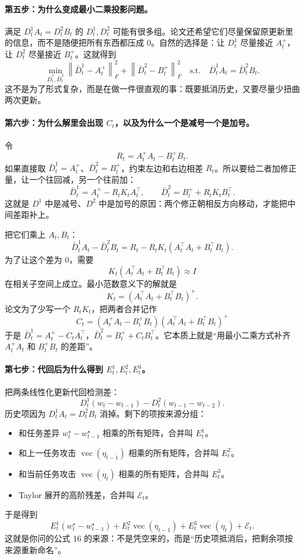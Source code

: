\documentclass[UTF8,fontset=none,11pt]{ctexart}
\theoremstyle{cnstyle}
\newcommand{\vect}{\operatorname{vec}}
\newcommand{\norm}[1]{\left\lVert #1\right\rVert}
\begin{document}
\paragraph{第五步：为什么变成最小二乘投影问题。}
满足 \(D_t^1A_t=D_t^2B_t\) 的 \(D_t^1,D_t^2\) 可能有很多组。论文还希望它们尽量保留原更新里的信息，而不是随便把所有东西都压成 0。自然的选择是：让 \(D_t^1\) 尽量接近 \(A_t^+\)，让 \(D_t^2\) 尽量接近 \(B_t^+\)。这就得到
\[
  \min_{\bar D_t^1,\bar D_t^2}
  \norm{\bar D_t^1-A_t^+}_F^2
  +\norm{\bar D_t^2-B_t^+}_F^2
  \quad
  \text{s.t.}\quad
  \bar D_t^1A_t=\bar D_t^2B_t.
\]
这不是为了形式复杂，而是在做一件很直观的事：既要抵消历史，又要尽量少扭曲两次更新。

\paragraph{第六步：为什么解里会出现 \(C_t\)，以及为什么一个是减号一个是加号。}
令
\[
  R_t=A_t^+A_t-B_t^+B_t.
\]
如果直接取 \(\bar D_t^1=A_t^+\)、\(\bar D_t^2=B_t^+\)，约束左边和右边相差 \(R_t\)。所以要给二者加修正量，让一个往回减，另一个往前加：
\[
  \bar D_t^1=A_t^+-R_tK_tA_t^\top,
  \qquad
  \bar D_t^2=B_t^+ +R_tK_tB_t^\top.
\]
这就是 \(D^1\) 中是减号、\(D^2\) 中是加号的原因：两个修正朝相反方向移动，才能把中间差距补上。

把它们乘上 \(A_t,B_t\)：
\[
  \bar D_t^1A_t-\bar D_t^2B_t
  =
  R_t-R_tK_t(A_t^\top A_t+B_t^\top B_t).
\]
为了让这个差为 0，需要
\[
  K_t(A_t^\top A_t+B_t^\top B_t)
  \approx I
\]
在相关子空间上成立。最小范数意义下的解就是
\[
  K_t=(A_t^\top A_t+B_t^\top B_t)^+.
\]
论文为了少写一个 \(R_tK_t\)，把两者合并记作
\[
  C_t=(A_t^+A_t-B_t^+B_t)(A_t^\top A_t+B_t^\top B_t)^+
\]
于是 \(\bar D_t^1=A_t^+-C_tA_t^\top\)，\(\bar D_t^2=B_t^++C_tB_t^\top\)。它本质上就是“用最小二乘方式补齐 \(A_t^+A_t\) 和 \(B_t^+B_t\) 的差距”。

\paragraph{第七步：代回后为什么得到 \(E_t^1,E_t^2,E_t^3\)。}
把两条线性化更新代回检测差：
\[
  D_t^1(w_t-w_{t-1})-D_t^2(w_{t-1}-w_{t-2}).
\]
历史项因为 \(D_t^1A_t=D_t^2B_t\) 消掉。剩下的项按来源分组：
\begin{itemize}
  \item 和任务差异 \(w_t^\star-w_{t-1}^\star\) 相乘的所有矩阵，合并叫 \(E_t^1\)。
  \item 和上一任务攻击 \(\vect(\eta_{t-1})\) 相乘的所有矩阵，合并叫 \(E_t^2\)。
  \item 和当前任务攻击 \(\vect(\eta_t)\) 相乘的所有矩阵，合并叫 \(E_t^3\)。
  \item Taylor 展开的高阶残差，合并叫 \(\mathcal E_t\)。
\end{itemize}
于是得到
\[
  E_t^1(w_t^\star-w_{t-1}^\star)
  +E_t^2\vect(\eta_{t-1})
  +E_t^3\vect(\eta_t)
  +\mathcal E_t.
\]
这就是你问的公式 16 的来源：不是凭空来的，而是“历史项抵消后，把剩余项按来源重新命名”。
\end{document}
